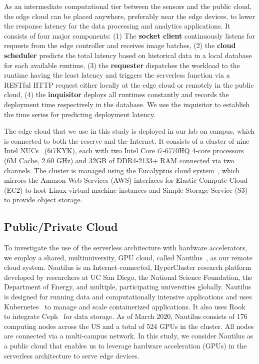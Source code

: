 As an intermediate computational tier between the sensors and the public cloud, the edge cloud can be placed anywhere, preferably near the edge devices, to lower the response latency for the data processing and analytics applications. It consists of four major components: (1) The \textbf{socket client} continuously listens for requests from the edge controller and receives image batches, (2) the \textbf{cloud scheduler} predicts the total latency based on historical data in a local database for each available runtime, (3) the \textbf{requester} dispatches the workload to the runtime having the least latency and triggers the  serverless function via a RESTful HTTP request either locally at the edge cloud or remotely in the public cloud, (4) the \textbf{inquisitor} deploys all runtimes constantly and records the deployment time respectively in the database. We use the inquisitor to establish the time series for predicting deployment latency.

The edge cloud that we use in this study is deployed 
in our lab on campus, which is connected to both the reserve and the Internet. It consists of a cluster of nine Intel NUCs~\cite{ref:nucs} (6i7KYK), each with two Intel Core i7-6770HQ 4-core processors (6M Cache, 2.60 GHz) and 32GB of DDR4-2133+ RAM connected via two channels. The cluster is managed using the Eucalyptus cloud system~\cite{ref:euca}, which mirrors the Amazon Web Services (AWS) interfaces for Elastic Compute Cloud (EC2) to host Linux virtual machine instances and Simple Storage Service (S3) to provide object storage.
 
 \subsection{Public/Private Cloud}

To investigate the use of the serverless architecture with hardware accelerators, we employ a shared, multiuniversity, GPU cloud, called  Nautilus~\cite{ref:nautilus}, as our remote cloud system. Nautilus is an Internet-connected, HyperCluster research platform developed by researchers at UC San Diego, the National Science Foundation, the Department of Energy, and multiple, participating universities globally.  Nautilus is designed for running data and computationally intensive applications and uses Kubernetes~\cite{ref:k8s} to manage and scale containerized applications. It also uses Rook~\cite{ref:rook} to integrate Ceph~\cite{ref:ceph} for data storage. As of March 2020, Nautilus consists of 176 computing nodes across the US and a total of 524 GPUs in the cluster. All nodes are connected via a multi-campus network. In this study, we consider Nautilus as a public cloud that enables us to leverage hardware acceleration (GPUs) in the serverless architecture to serve edge devices. 

